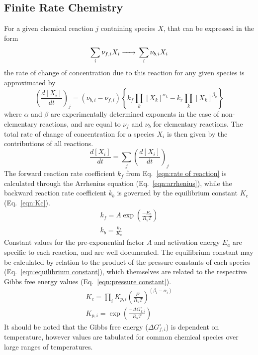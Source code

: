 \documentclass[a4paper]{article}
\begin{document}
\subsection{Finite Rate Chemistry}\label{subsec:finite rate chem}
For a given chemical reaction \(j\) containing species \(X\), that can be expressed in the form 
\begin{equation}
    \sum_i \nu_{f,i} X_i \ce{->} \sum_i \nu_{b,i} X_i 
\end{equation}
the rate of change of concentration due to this reaction for any given species is approximated by
\begin{equation}\label{eqn:rate of reaction}
    \left(\frac{d [X_i]}{d t} \right)_j
    = (\nu_{b,i}-\nu_{f,i}) \left\lbrace k_f \prod_k [X_k]^{\alpha_k} - k_r \prod_k [X_k]^{\beta_k} \right\rbrace
\end{equation}
where \(\alpha\) and \(\beta\) are experimentally determined exponents in the case of non-elementary reactions, and are equal to \(\nu_f\) and \(\nu_b\) for elementary reactions. The total rate of change of concentration for a species \(X_i\) is then given by the contributions of all reactions. 
\begin{equation}
    \frac{d [X_i]}{d t} = \sum_j \left(\frac{d [X_i]}{d t} \right)_j
\end{equation}
The forward reaction rate coefficient \(k_f\) from Eq.~\ref{eqn:rate of reaction} is calculated through the Arrhenius equation (Eq.~\ref{eqn:arrhenius}), while the backward reaction rate coefficient \(k_b\) is governed by the equilibrium constant \(K_c\) (Eq.~\ref{eqn:Kc}).
\begin{gather}
    \label{eqn:arrhenius}
    k_f = A\exp\left(\frac{-E_a}{R_uT}\right) \\
    k_b = \frac{k_f}{K_c} \label{eqn:Kc}
\end{gather}
Constant values for the pre-exponential factor \(A\) and activation energy \(E_a\) are specific to each reaction, and are well documented.  The equilibrium constant may be calculated by relation to the product of the pressure constants of each species (Eq.~\ref{eqn:equilibrium constant}), which themselves are related to the respective Gibbs free energy values (Eq.~\ref{eqn:pressure constant}). 
\begin{gather}
    \label{eqn:equilibrium constant}
    K_c = \prod_i K_{p,i} \left(\frac{P^\circ}{R_u T}\right)^{(\beta_i-\alpha_i)} \\
    \label{eqn:pressure constant}
    K_{p,i} = \exp\left(\frac{-\Delta G^\circ_{f,i}}{R_u T}\right)
\end{gather}
It should be noted that the Gibbs free energy (\(\Delta G^\circ_{f,i}\)) is dependent on temperature, however values are tabulated for common chemical species over large ranges of temperatures. 
\end{document}
